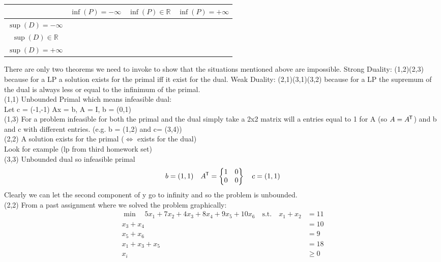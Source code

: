 \documentclass{article}
\newcommand*{\tran}{^{\mkern-1.5mu\mathsf{T}}}%
\begin{document}
		
	\clearpage
	
	\section{}
	
	\begin{table}[htbp!]
		\begin{tabular}{|c|c|c|c|}
			\hline
			& $\inf(P) = -\infty$&$\inf(P) \in \mathbb{R}$&$\inf(P) = +\infty$\\\hline
			$\sup(D) = -\infty$ &\checkmark& \texttimes & \checkmark \\ \hline 
			$\sup(D) \in \mathbb{R}$& \texttimes& \checkmark& \texttimes \\ \hline 
			$\sup(D) = + \infty$ &\texttimes & \texttimes & \checkmark \\ \hline 
		\end{tabular}
	\end{table}
	
	There are only two theorems we need to invoke to show that the situations mentioned above are impossible.
	Strong Duality: (1,2)(2,3) because for a LP a solution exists for the primal iff it exist for the dual. Weak Duality:  (2,1)(3,1)(3,2) because for a LP the supremum of the dual is always less or equal to the infinimum of the primal.\\
	(1,1) Unbounded Primal which means infeasible dual:\\
	Let c = (-1,-1) Ax = b, A = I, b = (0,1)\\
	(1,3) For a problem infeasible for both the primal and the dual simply take a 2x2 matrix will a entries equal to 1 for A (so $A=A\tran$) and b and c with different entries. (e.g. b = (1,2) and c= (3,4))\\
	(2,2) A solution exists for the primal ($\iff$ exists for the dual)\\
	Look for example (lp from third homework set)\\
	(3,3) Unbounded dual so infeasible primal \\
	\begin{equation*}
	b = (1,1) \quad A\tran = \begin{Bmatrix}
	1&0\\
	0&0
	\end{Bmatrix}
	\quad c = (1,1)
	\end{equation*}
	Clearly we can let the second component of y go to infinity and so the problem is unbounded. \\
	(2,2) From a past assignment where we solved the problem graphically:
	\begin{align*}
	\min \quad 5x_1 + 7x_2 + 4x_3 + 8x_4 + 9x_5 + 10x_6 \quad \text{s.t.} \quad x_1 + x_2 &= 11\\
	x_3 + x_4 &= 10\\
	x_5 + x_6 &= 9\\
	x_1 + x_3 + x_5 &= 18\\
	x_i &\ge 0
    \end{align*}
	
\end{document}
